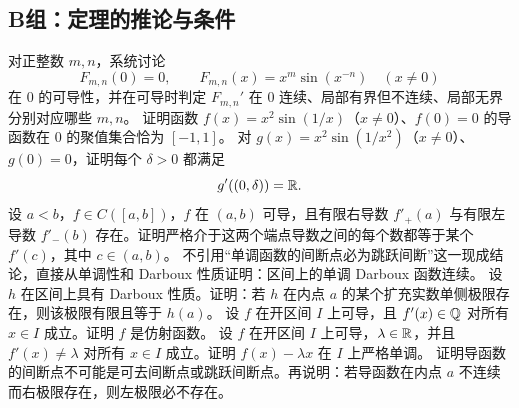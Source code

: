 \subsection*{B组：定理的推论与条件}
\begin{enumerate}[label=\textbf{\thechapter.\arabic*.},resume]
  对正整数 \(m,n\)，系统讨论
 \[
  F_{m,n}(0)=0,
  \qquad F_{m,n}(x)=x^m\sin(x^{-n})\quad(x\ne0)
 \]
在 \(0\) 的可导性，并在可导时判定 \(F_{m,n}'\) 在 \(0\) 连续、局部有界但不连续、局部无界分别对应哪些 \(m,n\)。
  证明函数 \(f(x)=x^2\sin(1/x)\)（\(x\ne0\)）、\(f(0)=0\) 的导函数在 \(0\) 的聚值集合恰为 \([-1,1]\)。
  对 \(g(x)=x^2\sin(1/x^2)\)（\(x\ne0\)）、\(g(0)=0\)，证明每个 \(\delta>0\) 都满足
 \[
  g'((0,\delta))=\mathbb{R}.
 \]
  设 \(a<b\)，\(f\in C([a,b])\)，\(f\) 在 \((a,b)\) 可导，且有限右导数 \(f'_+(a)\) 与有限左导数 \(f'_-(b)\) 存在。证明严格介于这两个端点导数之间的每个数都等于某个 \(f'(c)\)，其中 \(c\in(a,b)\)。
  不引用“单调函数的间断点必为跳跃间断”这一现成结论，直接从单调性和 Darboux 性质证明：区间上的单调 Darboux 函数连续。
  设 \(h\) 在区间上具有 Darboux 性质。证明：若 \(h\) 在内点 \(a\) 的某个扩充实数单侧极限存在，则该极限有限且等于 \(h(a)\)。
  设 \(f\) 在开区间 \(I\) 上可导，且 \(f'(x)\in\mathbb{Q}\) 对所有 \(x\in I\) 成立。证明 \(f\) 是仿射函数。
  设 \(f\) 在开区间 \(I\) 上可导，\(\lambda\in\mathbb{R}\)，并且 \(f'(x)\ne\lambda\) 对所有 \(x\in I\) 成立。证明 \(f(x)-\lambda x\) 在 \(I\) 上严格单调。
  证明导函数的间断点不可能是可去间断点或跳跃间断点。再说明：若导函数在内点 \(a\) 不连续而右极限存在，则左极限必不存在。
\end{enumerate}

